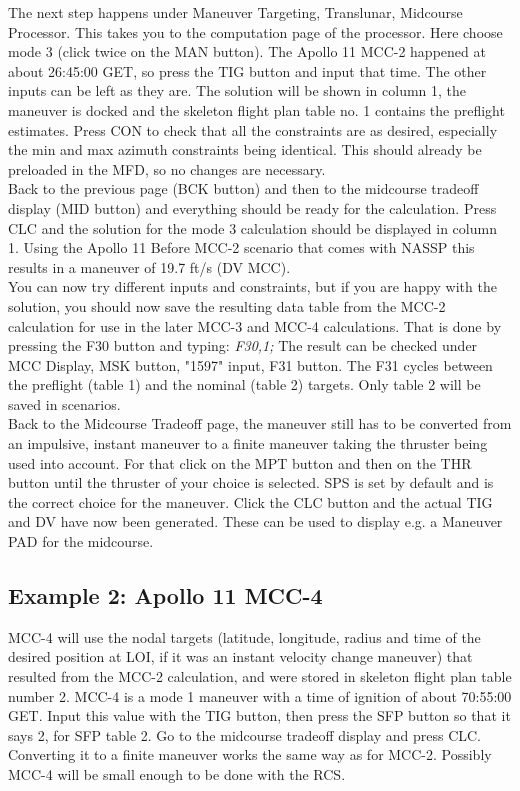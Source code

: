 \documentclass[11pt]{article} %
\begin{document}
The next step happens under Maneuver Targeting, Translunar, Midcourse Processor. This takes you to the computation page of the processor. Here choose mode 3 (click twice on the MAN button). The Apollo 11 MCC-2 happened at about 26:45:00 GET, so press the TIG button and input that time. The other inputs can be left as they are. The solution will be shown in column 1, the maneuver is docked and the skeleton flight plan table no. 1 contains the preflight estimates. Press CON to check that all the constraints are as desired, especially the min and max azimuth constraints being identical. This should already be preloaded in the MFD, so no changes are necessary.\\ Back to the previous page (BCK button) and then to the midcourse tradeoff display (MID button) and everything should be ready for the calculation. Press CLC and the solution for the mode 3 calculation should be displayed in column 1. Using the Apollo 11 Before MCC-2 scenario that comes with NASSP this results in a maneuver of 19.7 ft/s (DV MCC).\\

You can now try different inputs and constraints, but if you are happy with the solution, you should now save the resulting data table from the MCC-2 calculation for use in the later MCC-3 and MCC-4 calculations. That is done by pressing the F30 button and typing: \emph{F30,1;} The result can be checked under MCC Display, MSK button, "1597" input, F31 button. The F31 cycles between the preflight (table 1) and the nominal (table 2) targets. Only table 2 will be saved in scenarios.\\

Back to the Midcourse Tradeoff page, the maneuver still has to be converted from an impulsive, instant maneuver to a finite maneuver taking the thruster being used into account. For that click on the MPT button and then on the THR button until the thruster of your choice is selected. SPS is set by default and is the correct choice for the maneuver. Click the CLC button and the actual TIG and DV have now been generated. These can be used to display e.g. a Maneuver PAD for the midcourse.\\

\subsection{Example 2: Apollo 11 MCC-4}

MCC-4 will use the nodal targets (latitude, longitude, radius and time of the desired position at LOI, if it was an instant velocity change maneuver) that resulted from the MCC-2 calculation, and were stored in skeleton flight plan table number 2. MCC-4 is a mode 1 maneuver with a time of ignition of about 70:55:00 GET. Input this value with the TIG button, then press the SFP button so that it says 2, for SFP table 2. Go to the midcourse tradeoff display and press CLC. Converting it to a finite maneuver works the same way as for MCC-2. Possibly MCC-4 will be small enough to be done with the RCS.\\
\end{document}
